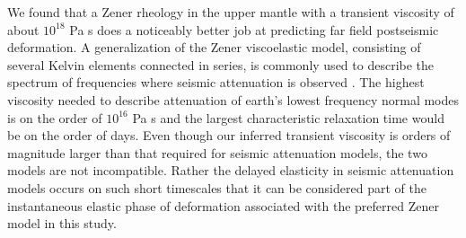 \documentclass[12pt]{article}
\begin{document}
We found that a Zener rheology in the upper mantle with a transient viscosity of about $10^{18}$ Pa s does a noticeably better job at predicting far field postseismic deformation.  A generalization of the Zener viscoelastic model, consisting of several Kelvin elements connected in series, is commonly used to describe the spectrum of frequencies where seismic attenuation is observed \cite{Liu1976}.  The highest viscosity needed to describe attenuation of earth's lowest frequency normal modes is on the order of $10^{16}$ Pa s \cite{Yuen1982} and the largest characteristic relaxation time would be on the order of days. Even though our inferred transient viscosity is orders of magnitude larger than that required for seismic attenuation models, the two models are not incompatible.  Rather the delayed elasticity in seismic attenuation models occurs on such short timescales that it can be considered  part of the instantaneous elastic phase of deformation associated with the preferred Zener model in this study. 
\end{document}
